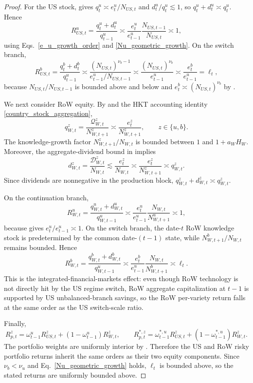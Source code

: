 \documentclass{article}
\begin{document}
\begin{proof}
For the US stock,  gives $q_t^u\asymp e_t^u/N_{US,t}$ and $d_t^u/q_t^u\lesssim1$, so $q_t^u+d_t^u\asymp q_t^u$. Hence
\[
R_{US,t}^u
=
\frac{q_t^u+d_t^u}{q_{t-1}^u}
\asymp
\frac{e_t^u}{e_{t-1}^u}\frac{N_{US,t-1}}{N_{US,t}}
\asymp1,
\]
using Eqs.~\eqref{e_u_growth_order} and \eqref{Nu_geometric_growth}. On the switch branch,
\[
R_{US,t}^b
=
\frac{q_t^b+d_t^b}{q_{t-1}^u}
\asymp
\frac{(N_{US,t})^{\nu_b-1}}{e_{t-1}^u/N_{US,t-1}}
\asymp
\frac{(N_{US,t})^{\nu_b}}{e_{t-1}^u}
\asymp
\frac{e_t^b}{e_{t-1}^u}
=\ell_t,
\]
because $N_{US,t}/N_{US,t-1}$ is bounded above and below and $e_t^b\asymp (N_{US,t})^{\nu_b}$ by .

We next consider RoW equity. By  and the HKT accounting identity \eqref{country_stock_aggregation},
\[
q_{W,t}^z
=
\frac{\mathcal Q_{W,t}^z}{N_{W,t+1}^z}
\asymp
\frac{e_t^z}{N_{W,t+1}^z},
\qquad z\in\{u,b\}.
\]
The knowledge-growth factor $N_{W,t+1}^z/N_{W,t}$ is bounded between $1$ and $1+a_WH_W$. Moreover, the aggregate-dividend bound in  implies
\[
d_{W,t}^z=\frac{\mathcal D_{W,t}^z}{N_{W,t}}
\lesssim
\frac{e_t^z}{N_{W,t}}
\asymp
\frac{e_t^z}{N_{W,t+1}^z}
\asymp q_{W,t}^z.
\]
Since dividends are nonnegative in the production block, $q_{W,t}^z+d_{W,t}^z\asymp q_{W,t}^z$.

On the continuation branch,
\[
R_{W,t}^u
=
\frac{q_{W,t}^u+d_{W,t}^u}{q_{W,t-1}^u}
\asymp
\frac{e_t^u}{e_{t-1}^u}\frac{N_{W,t}}{N_{W,t+1}^u}
\asymp 1,
\]
because  gives $e_t^u/e_{t-1}^u\asymp 1$. On the switch branch, the date-$t$ RoW knowledge stock is predetermined by the common date-$(t-1)$ state, while $N_{W,t+1}^b/N_{W,t}$ remains bounded. Hence
\[
R_{W,t}^b
=
\frac{q_{W,t}^b+d_{W,t}^b}{q_{W,t-1}^u}
\asymp
\frac{e_t^b}{e_{t-1}^u}\frac{N_{W,t}}{N_{W,t+1}^b}
\asymp
\ell_t.
\]
This is the integrated-financial-markets effect: even though RoW technology is not directly hit by the US regime switch, RoW aggregate capitalization at $t-1$ is supported by US unbalanced-branch savings, so the RoW per-variety return falls at the same order as the US switch-scale ratio.

Finally,
\[
R_{p,t}^z=\omega_{t-1}^uR_{US,t}^z+(1-\omega_{t-1}^u)R_{W,t}^z,
\qquad
R_{p,t}^{*,z}=\omega_{t-1}^{*,u}R_{US,t}^z+(1-\omega_{t-1}^{*,u})R_{W,t}^z.
\]
The portfolio weights are uniformly interior by . Therefore the US and RoW risky portfolio returns inherit the same orders as their two equity components. Since $\nu_b<\nu_u$ and Eq.~\eqref{Nu_geometric_growth} holds, $\ell_t$ is bounded above, so the stated returns are uniformly bounded above.
\end{proof}
\end{document}
